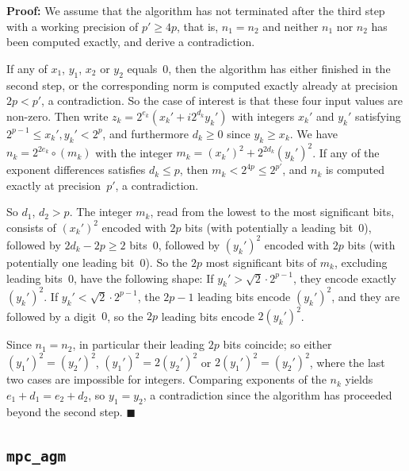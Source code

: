 \documentclass [11pt]{article}
\newcommand {\round}{\operatorname {\circ}}
\renewcommand {\leq}{\leqslant}
\renewcommand {\geq}{\geqslant}
\newenvironment{proof}{\noindent \textbf {Proof:}}{{\hspace* {\fill}$\blacksquare$}}
\begin{document}
\begin {proof}
We assume that the algorithm has not terminated after the third step with a
working precision of $p' \geq 4p$, that is, $n_1 = n_2$ and neither
$n_1$ nor $n_2$ has been computed exactly, and derive a contradiction.

If any of $x_1$, $y_1$, $x_2$ or $y_2$ equals~$0$, then the algorithm has
either finished in the second step, or the corresponding norm is computed
exactly already at precision $2p < p'$, a contradiction.
So the case of interest is that these four input values are non-zero.
Then write $z_k = 2^{e_k} (x_k' + i 2^{d_k} y_k')$ with integers
$x_k'$ and $y_k'$ satisfying $2^{p-1} \leq x_k', y_k' < 2^p$, and
furthermore $d_k \geq 0$ since $y_k \geq x_k$.
We have
$n_k = 2^{2 e_k} \round (m_k)$ with the integer
$m_k = (x_k')^2 + 2^{2 d_k} (y_k')^2$.
If any of the exponent differences satisfies $d_k \leq p$, then
$m_k < 2^{4 p} \leq 2^{p'}$, and $n_k$ is computed exactly at precision~$p'$,
a contradiction.

So $d_1$, $d_2 > p$. The integer $m_k$, read from the lowest to the most
significant bits, consists of $(x_k')^2$ encoded with $2 p$ bits (with
potentially a leading bit~$0$), followed by $2 d_k - 2 p \geq 2$ bits~$0$,
followed by $(y_k')^2$ encoded with $2 p$ bits (with potentially one leading
bit~$0$).
So the $2 p$ most significant bits of $m_k$, excluding leading
bits~$0$, have the following shape:
If $y_k' > \sqrt 2 \cdot 2^{p-1}$, they encode exactly $(y_k')^2$.
If $y_k' < \sqrt 2 \cdot 2^{p-1}$, the $2 p - 1$ leading bits encode
$(y_k')^2$, and they are followed by a digit~$0$, so the $2 p$ leading
bits encode $2 (y_k')^2$.

Since $n_1 = n_2$, in particular their leading $2 p$ bits coincide;
so either $(y_1')^2 = (y_2')^2$, $(y_1')^2 = 2 (y_2')^2$ or
$2 (y_1')^2 = (y_2')^2$, where the last two cases are impossible
for integers.
Comparing exponents of the $n_k$ yields
$e_1 + d_1 = e_2 + d_2$, so $y_1 = y_2$,
a contradiction since the algorithm has proceeded beyond the second step.
\end {proof}


\subsection{\texttt {mpc\_agm}}
\label {ssec:agm}
\end{document}
